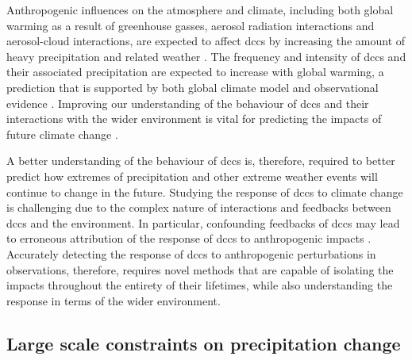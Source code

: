 Anthropogenic influences on the atmosphere and climate, including both global warming as a result of greenhouse gasses, aerosol radiation interactions and aerosol-cloud interactions, are expected to affect \acrshort{dcc}s by increasing the amount of heavy precipitation and related weather \citep[e.g.][]{allen_constraints_2002, trenberth_changing_2003, held_robust_2006, khain2005aerosol, koren_smoke_2008, rosenfeld_flood_2008, fan_microphysical_2013, fan_review_2016}.
The frequency and intensity of \acrshort{dcc}s and their associated precipitation are expected to increase with global warming, a prediction that is supported by both global climate model \citep{allen_constraints_2002, trenberth_changing_2003, held_robust_2006, muller_energetic_2011, ogorman_energetic_2012, ogorman_precipitation_2015} and observational evidence \citep{tan_increases_2015, berg_strong_2013, aumann_increased_2018, houze_extreme_2019}.
Improving our understanding of the behaviour of \acrshort{dcc}s and their interactions with the wider environment is vital for predicting the impacts of future climate change \citep{westra_future_2014}.

A better understanding of the behaviour of \acrshort{dcc}s is, therefore, required to better predict how extremes of precipitation and other extreme weather events will continue to change in the future.
Studying the response of \acrshort{dcc}s to climate change is challenging due to the complex nature of interactions and feedbacks between \acrshort{dcc}s and the environment.
In particular, confounding feedbacks of \acrshort{dcc}s may lead to erroneous attribution of the response of \acrshort{dcc}s to anthropogenic impacts \citep{varble_erroneous_2018}.
Accurately detecting the response of \acrshort{dcc}s to anthropogenic perturbations in observations, therefore, requires novel methods that are capable of isolating the impacts throughout the entirety of their lifetimes, while also understanding the response in terms of the wider environment.


\subsection{Large scale constraints on precipitation change}

